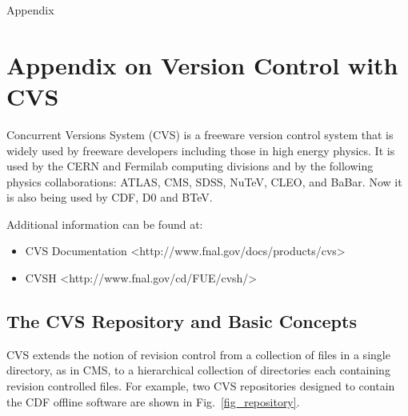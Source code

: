 
\clearpage
{\Huge \flushleft Appendix}
\appendix

\section{Appendix on Version Control with CVS}
\label{app_cvs}

Concurrent Versions System (CVS) is a 
freeware version control system that is widely
used by freeware developers including those in high energy physics. 
It is used by the CERN and Fermilab computing
divisions and by the following physics collaborations: ATLAS, CMS, SDSS, NuTeV,
CLEO, and BaBar.  Now it is also being used by CDF, D0 and BTeV. 

Additional information can be found at:

\begin{itemize}
\item CVS Documentation <http://www.fnal.gov/docs/products/cvs>
\item CVSH <http://www.fnal.gov/cd/FUE/cvsh/>      
\end{itemize}

\subsection{ The CVS Repository and Basic Concepts}

CVS extends the notion of revision control from
a collection of files in a single directory, as in CMS, to a hierarchical
collection of directories each containing revision controlled files.
For example, two CVS repositories designed to contain the CDF offline software
are shown in Fig.~\ref{fig_repository}.      


